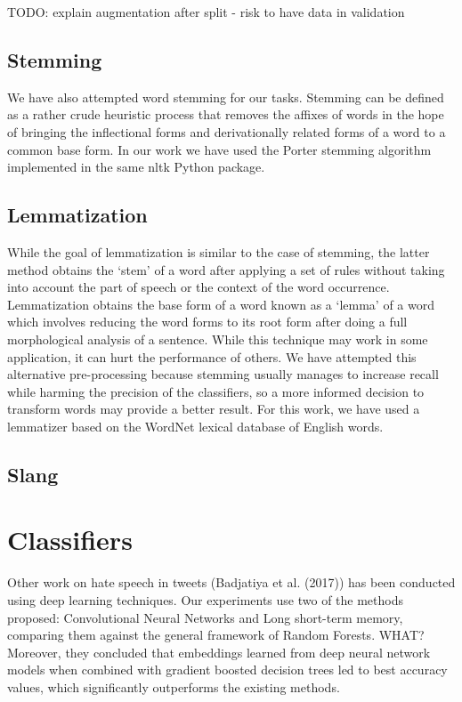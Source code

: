 \documentclass[11pt,a4paper]{article}
\begin{document}
TODO: explain augmentation after split - risk to have data in validation

\subsection{Stemming}

We have also attempted word stemming for our tasks. Stemming can be defined as a rather crude heuristic process that removes the affixes of words in the hope of bringing the inflectional forms and derivationally related forms of a word to a common base form. In our work we have used the Porter stemming algorithm implemented in the same nltk Python package.

\subsection{Lemmatization}

While the goal of lemmatization is similar to the case of stemming, the latter method obtains the ‘stem’ of a word after applying a set of rules without taking into account the part of speech or the context of the word occurrence. Lemmatization obtains the base form of a word known as a ‘lemma’ of a word which involves
reducing the word forms to its root form after doing a full morphological analysis of a sentence. While this technique may work in some application, it can hurt the performance of others. We have attempted this alternative pre-processing because stemming usually manages to increase recall while harming the precision of the classifiers, so a more informed decision to transform words may provide a better result. For this work, we have used a lemmatizer based on the WordNet lexical database of English words.

\subsection{Slang}

\section{Classifiers}

Other work on hate speech in tweets (Badjatiya et al. (2017)) has been conducted using deep learning techniques. Our experiments use two of the methods proposed: Convolutional Neural Networks and Long short-term memory, comparing them against the general framework of Random Forests.
WHAT?
Moreover, they concluded that embeddings learned from
deep neural network models when combined with gradient boosted decision trees led to best accuracy values, which significantly outperforms the
existing methods.
\end{document}
